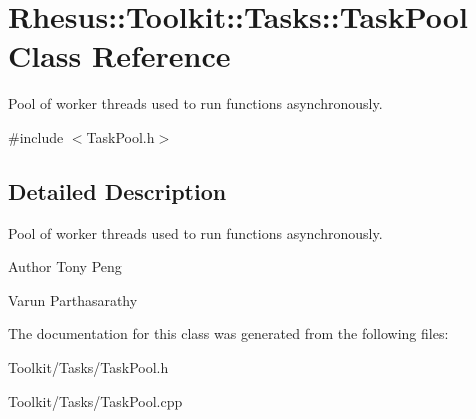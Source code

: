 \hypertarget{class_rhesus_1_1_toolkit_1_1_tasks_1_1_task_pool}{\section{Rhesus\-:\-:Toolkit\-:\-:Tasks\-:\-:Task\-Pool Class Reference}
\label{class_rhesus_1_1_toolkit_1_1_tasks_1_1_task_pool}
}


Pool of worker threads used to run functions asynchronously.  




{\ttfamily \#include $<$Task\-Pool.\-h$>$}



\subsection{Detailed Description}
Pool of worker threads used to run functions asynchronously. 

\begin{DoxyAuthor}{Author}
Tony Peng 

Varun Parthasarathy 
\end{DoxyAuthor}


The documentation for this class was generated from the following files\-:\begin{DoxyCompactItemize}
\item 
Toolkit/\-Tasks/Task\-Pool.\-h\item 
Toolkit/\-Tasks/Task\-Pool.\-cpp\end{DoxyCompactItemize}
